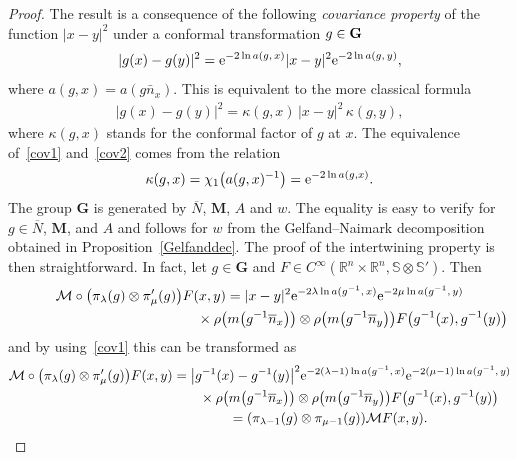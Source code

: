 \documentclass[10pt,a4paper]{amsart}
\numberwithin{equation}{section}
\begin{document}
\begin{proof} The result is a consequence of the following \emph{covariance property} of the function $\vert x-y\vert^2$ under a conformal transformation $g\in \bf G$
\begin{gather}\label{cov1}
\vert g(x)-g(y)\vert^2 = {\rm e}^{-2\ln a(g,\, x)} \vert x-y\vert^2 {\rm e}^{-2\ln a(g,\, y)} ,
\end{gather}
where $a(g,x) = a(g\bar{n}_x)$. This is equivalent to the more classical formula
\begin{gather}\label{cov2}
\vert g(x)-g(y)\vert^2 = \kappa(g,x)\, \vert x-y\vert^2\, \kappa(g,y),
\end{gather}
where $\kappa(g,x)$ stands for the conformal factor of $g$ at $x$. The equivalence of~\eqref{cov1} and~\eqref{cov2} comes from the relation
\begin{gather*}
\kappa(g,x) = \chi_1\big(a(g,x) ^{-1}\big) = {\rm e}^{-2\ln a(g,x)}.
\end{gather*}
 The group $\mathbf G$ is generated by $\overline N$, $\mathbf M$, $A$ and $w$. The equality is easy to verify for $g\in \overline N$, $\mathbf M$, and $A$ and follows for $w$ from the Gelfand--Naimark decomposition obtained in Proposition~\ref{Gelfanddec}.
 The proof of the intertwining property is then straightforward. In fact, let $g\in \mathbf G$ and $F\in C^\infty(\mathbb R^n\times \mathbb R^n, \mathbb S\otimes \mathbb S')$. Then
 \begin{gather*}
 \mathcal{M}\circ \big(\pi_\lambda(g)\otimes \pi'_\mu(g)\big)F (x,y)
= \vert x-y\vert^2 \mathrm{e}^{-2\lambda \ln a(g^{-1},\,x)} \mathrm{e}^{-2\mu \ln a(g^{-1},\,y)}
\\ \hphantom{ \mathcal{M}\circ \big(\pi_\lambda(g)\otimes \pi'_\mu(g)\big)F (x,y)=}
{}\times \rho\big(m\big(g^{-1} \overline n_x\big)\big)\otimes \rho\big(m\big(g^{-1}\overline n_y\big)\big) F\big(g^{-1}(x), g^{-1}(y)\big)
 \end{gather*}
 and by using~\eqref{cov1} this can be transformed as
\begin{gather*}
\mathcal{M}\circ \big(\pi_\lambda(g)\otimes \pi'_\mu(g)\big)F (x,y)
= \big\vert g^{-1}(x) -g^{-1}(y) \big\vert^2 \mathrm{e}^{-2(\lambda-1) \ln a(g^{-1},\,x)}\mathrm{e}^{-2(\mu-1) \ln a(g^{-1},\,y)}
\\ \hphantom{\mathcal{M}\circ \big(\pi_\lambda(g)\otimes \pi'_\mu(g)\big)F (x,y)= }
{}\times \rho\big(m\big(g^{-1} \overline n_x\big)\big)
\otimes \rho\big(m\big(g^{-1}\overline n_y\big)\big)F\big(g^{-1}(x), g^{-1}(y)\big)
\\ \hphantom{\mathcal{M}\circ \big(\pi_\lambda(g)\otimes \pi'_\mu(g)\big)F (x,y)}
{} = (\pi_{\lambda-1}(g) \otimes \pi_{\mu-1}(g)) \mathcal{M} F(x,y) .
 \tag*{\qed}
\end{gather*}
\renewcommand{\qed}{}
\end{proof}
\end{document}
